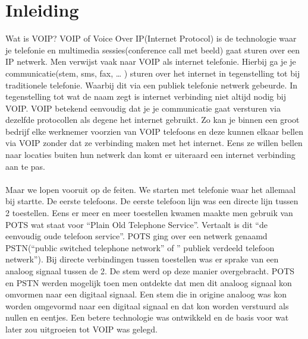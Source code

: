 \documentclass[pdftex,a4paper,12pt,twoside]{report}
\begin{document}

\tableofcontents



\chapter{Inleiding}
\label{ch:inleiding}

Wat is VOIP? VOIP of Voice Over IP(Internet Protocol) is de technologie waar je telefonie en multimedia sessies(conference call met beeld) gaat sturen over een IP netwerk. Men verwijst vaak naar VOIP als internet telefonie. Hierbij ga je je communicatie(stem, sms, fax, … ) sturen over het internet in tegenstelling tot bij traditionele telefonie. Waarbij dit via een publiek telefonie netwerk gebeurde. In tegenstelling tot wat de naam zegt is internet verbinding niet altijd nodig bij VOIP. VOIP betekend eenvoudig dat je je communicatie gaat versturen via dezelfde protocollen als degene het internet gebruikt. Zo kan je binnen een groot bedrijf elke werknemer voorzien van VOIP telefoons en deze kunnen elkaar bellen via VOIP zonder dat ze verbinding maken met het internet. Eens ze willen bellen naar locaties buiten hun netwerk dan komt er uiteraard een internet verbinding aan te pas.
\\ \\
Maar we lopen vooruit op de feiten. We starten met telefonie waar het allemaal bij startte. De eerste telefoons. De eerste telefoon lijn was een directe lijn tussen 2 toestellen. Eens er meer en meer toestellen kwamen maakte men gebruik van POTS wat staat voor “Plain Old Telephone Service”. Vertaalt is dit “de eenvoudig oude telefoon service”. POTS ging over een netwerk genaamd PSTN(“public switched telephone network” of ” publiek verdeeld telefoon netwerk”). Bij directe verbindingen tussen toestellen was er sprake van een analoog signaal tussen de 2. De stem werd op deze manier overgebracht. POTS en PSTN werden mogelijk toen men ontdekte dat men dit analoog signaal kon omvormen naar een digitaal signaal. Een stem die in origine analoog was kon worden omgevormd naar een digitaal signaal en dat kon worden verstuurd als nullen en eentjes. Een betere technologie was ontwikkeld en de basis voor wat later zou uitgroeien tot VOIP was gelegd. 
\end{document}
